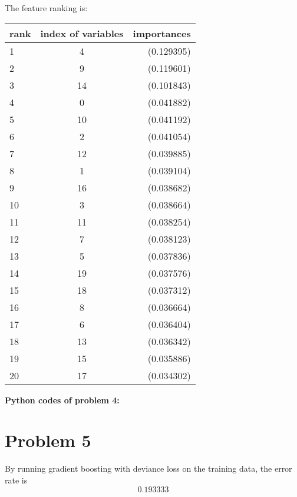 \documentclass{article}
\begin{document}
The feature ranking is:
\begin{center}
\begin{tabular}{ l | c | r  }
\hline
rank & index of variables & importances \\
\hline
 1 & 4 &  (0.129395)\\
2 & 9 & (0.119601) \\
3 & 14 & (0.101843) \\
4 & 0 & (0.041882) \\
5 & 10 & (0.041192) \\
6 & 2 & (0.041054) \\
7 & 12 & (0.039885) \\
8 & 1 & (0.039104) \\ 
9 & 16 & (0.038682) \\
10 & 3 & (0.038664) \\ 
11 & 11 & (0.038254) \\
12 & 7 & (0.038123) \\
13 & 5 & (0.037836) \\
14 & 19 & (0.037576) \\
15 & 18 & (0.037312) \\
16 & 8 & (0.036664) \\
17 & 6 & (0.036404) \\
18 &13 &(0.036342) \\
19 & 15 & (0.035886) \\
20 & 17 & (0.034302) \\
\end{tabular}
\end{center}

\textbf{Python codes of problem 4:}


\section{Problem 5}
By running gradient boosting with deviance loss on the training data, the error rate is
 			\begin{equation}
				0.193333
				\end{equation} 
\end{document}
